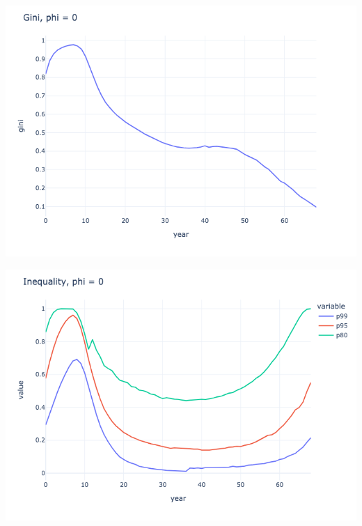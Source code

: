 \begin{questions}
\begin{solution}
\includegraphics[scale=0.5]{figures/gini_0_tax_15.png}

\includegraphics[scale=0.5]{figures/inequality_0_tax_15.png}

\end{solution}

\begin{solution}


\end{solution}


\end{questions}
